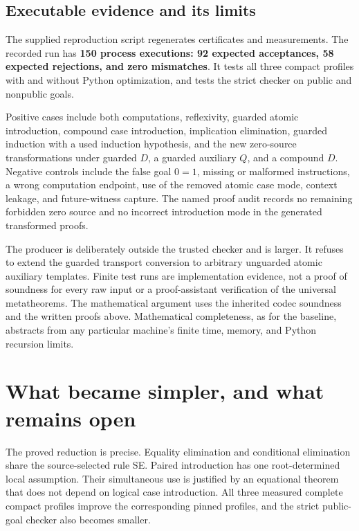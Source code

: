\documentclass[11pt,letterpaper]{article}
\theoremstyle{definition}
\begin{document}
\subsection{Executable evidence and its limits}

The supplied reproduction script regenerates certificates and measurements.
The recorded run has \textbf{150 process executions: 92 expected
acceptances, 58 expected rejections, and zero mismatches}. It tests all
three compact profiles with and without Python optimization, and tests the
strict checker on public and nonpublic goals.

Positive cases include both computations, reflexivity, guarded atomic
introduction, compound case introduction, implication elimination,
guarded induction with a used induction hypothesis, and the new
zero-source transformations under guarded $D$, a guarded auxiliary $Q$,
and a compound $D$. Negative controls include the false goal $0=1$,
missing or malformed instructions, a wrong computation endpoint, use of
the removed atomic case mode, context leakage, and future-witness capture.
The named proof audit records no remaining forbidden zero source and no
incorrect introduction mode in the generated transformed proofs.

The producer is deliberately outside the trusted checker and is larger.
It refuses to extend the guarded transport conversion to arbitrary
unguarded atomic auxiliary templates. Finite test runs are implementation
evidence, not a proof of soundness for every raw input or a proof-assistant
verification of the universal metatheorems. The mathematical argument uses
the inherited codec soundness and the written proofs above. Mathematical
completeness, as for the baseline, abstracts from any particular machine's
finite time, memory, and Python recursion limits.

\section{What became simpler, and what remains open}

The proved reduction is precise. Equality elimination and conditional
elimination share the source-selected rule SE. Paired introduction has one
root-determined local assumption. Their simultaneous use is justified by
an equational theorem that does not depend on logical case introduction.
All three measured complete compact profiles improve the corresponding
pinned profiles, and the strict public-goal checker also becomes smaller.
\end{document}
